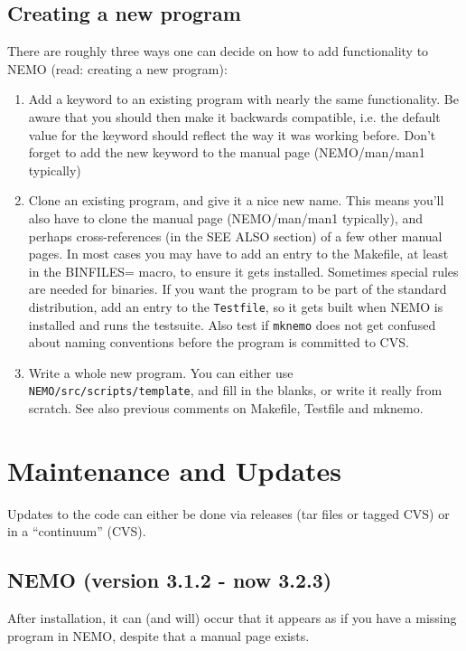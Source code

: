\section{Creating a new program}

There are roughly three ways one can decide on how to add functionality
to NEMO (read: creating a new program):

\begin{enumerate}
\item  Add a keyword to an existing program with nearly the same functionality.
Be aware that you should
then make it backwards compatible, i.e. the default value for the keyword
should reflect the way it was working before. Don't forget to add
the new keyword to the manual page (NEMO/man/man1 typically)

\item
Clone an existing program, and give it a nice new name. This means you'll also 
have to clone the manual page (NEMO/man/man1 typically), 
and perhaps cross-references (in the SEE ALSO section) of a few other manual
pages. In most cases you may have to add an entry to the Makefile,
at least in the BINFILES= macro, to ensure it gets installed.
Sometimes special rules are needed for binaries.
If you want the program to be part of the standard distribution, add
an entry to the {\tt Testfile}, so it gets built when NEMO is installed
and runs the testsuite.
Also test if {\tt mknemo}
does not get confused about naming conventions before the program
is committed to CVS.

\item
Write a whole new program. You can either use {\tt NEMO/src/scripts/template},
and fill in the blanks, or write it really from scratch. See also 
previous comments on Makefile, Testfile and mknemo.

\end{enumerate}

\chapter                {Maintenance and Updates}

Updates to the code can either be done via releases (tar files or
tagged CVS) or in a ``continuum'' (CVS).

\section{NEMO (version 3.1.2 - now 3.2.3)}
After installation, it can (and will) occur that it appears 
as if you have a missing program in NEMO, despite that a 
manual page exists.

